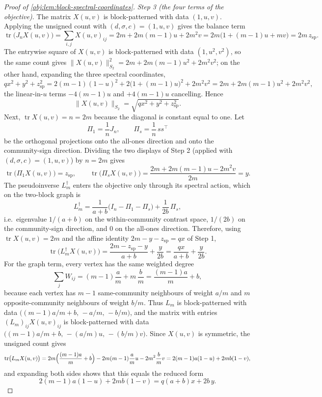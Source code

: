 \begin{proof}[Proof of \cref{obj:lem:block-spectral-coordinates}]
\emph{Step 3 (the four terms of the objective).}  The matrix \(X(u,v)\) is block-patterned with data \((1,u,v)\).  Applying the unsigned count with \((d,\sigma,c)=(1,u,v)\) gives the balance term
\[
\operatorname{tr}\bigl(J_nX(u,v)\bigr)
=\sum_{i,j}X(u,v)_{ij}
=2m+2m(m-1)u+2m^2v
=2m\bigl(1+(m-1)u+mv\bigr)
=2m\,z_{\mathrm{sp}} .
\]
The entrywise square of \(X(u,v)\) is block-patterned with data \((1,u^2,v^2)\), so the same count gives \(\|X(u,v)\|_{S_2}^2=2m+2m(m-1)u^2+2m^2v^2\); on the other hand, expanding the three spectral coordinates,
\[
qx^2+y^2+z_{\mathrm{sp}}^2
=2(m-1)(1-u)^2+2\bigl(1+(m-1)u\bigr)^2+2m^2v^2
=2m+2m(m-1)u^2+2m^2v^2 ,
\]
the linear-in-\(u\) terms \(-4(m-1)u\) and \(+4(m-1)u\) cancelling.  Hence
\[
\|X(u,v)\|_{S_2}=\sqrt{qx^2+y^2+z_{\mathrm{sp}}^2}.
\]
Next, \(\operatorname{tr}X(u,v)=n=2m\) because the diagonal is constant equal to one.  Let
\[
\Pi_1=\frac{1}{n}J_n,
\qquad
\Pi_s=\frac{1}{n}\,ss^\top
\]
be the orthogonal projections onto the all-ones direction and onto the community-sign direction.  Dividing the two displays of Step 2 (applied with \((d,\sigma,c)=(1,u,v)\)) by \(n=2m\) gives
\[
\operatorname{tr}\bigl(\Pi_1X(u,v)\bigr)=z_{\mathrm{sp}},
\qquad
\operatorname{tr}\bigl(\Pi_sX(u,v)\bigr)
=\frac{2m+2m(m-1)u-2m^2v}{2m}
=y .
\]
The pseudoinverse \(L_m^\dagger\) enters the objective only through its spectral action, which on the two-block graph is
\[
L_m^\dagger
=\frac{1}{a+b}\bigl(I_n-\Pi_1-\Pi_s\bigr)+\frac{1}{2b}\,\Pi_s ,
\]
i.e.\ eigenvalue \(1/(a+b)\) on the within-community contrast space, \(1/(2b)\) on the community-sign direction, and \(0\) on the all-ones direction.  Therefore, using \(\operatorname{tr}X(u,v)=2m\) and the affine identity \(2m-y-z_{\mathrm{sp}}=qx\) of Step 1,
\[
\operatorname{tr}\bigl(L_m^\dagger X(u,v)\bigr)
=\frac{2m-z_{\mathrm{sp}}-y}{a+b}+\frac{y}{2b}
=\frac{qx}{a+b}+\frac{y}{2b}.
\]
For the graph term, every vertex has the same weighted degree
\[
\sum_{j}W_{ij}=(m-1)\frac{a}{m}+m\,\frac{b}{m}=\frac{(m-1)a}{m}+b ,
\]
because each vertex has \(m-1\) same-community neighbours of weight \(a/m\) and \(m\) opposite-community neighbours of weight \(b/m\).  Thus \(L_m\) is block-patterned with data \(\bigl((m-1)a/m+b,\,-a/m,\,-b/m\bigr)\), and the matrix with entries \((L_m)_{ij}X(u,v)_{ij}\) is block-patterned with data \(\bigl((m-1)a/m+b,\,-(a/m)u,\,-(b/m)v\bigr)\).  Since \(X(u,v)\) is symmetric, the unsigned count gives
\[
\operatorname{tr}\bigl(L_mX(u,v)\bigr)
=2m\Bigl(\frac{(m-1)a}{m}+b\Bigr)-2m(m-1)\frac{a}{m}u-2m^2\frac{b}{m}v
=2(m-1)a(1-u)+2mb(1-v),
\]
and expanding both sides shows that this equals the reduced form
\[
2(m-1)a(1-u)+2mb(1-v)=q(a+b)x+2b\,y .
\]


\end{proof}
